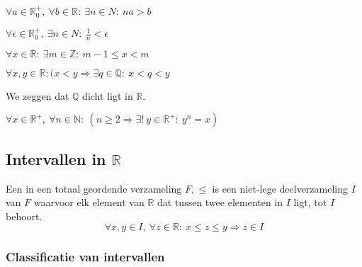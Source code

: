 \documentclass[main.tex]{subfiles}
\begin{document}
\begin{gev}
  $\forall a \in \mathbb{R}_{0}^{+},\ \forall b\in \mathbb{R}:\ \exists n\in N:\ na > b$
\end{gev}

\begin{gev}
  $\forall \epsilon \in \mathbb{R}_{0}^{+},\ \exists n\in N:\ \frac{1}{n} < \epsilon$
\end{gev}

\begin{gev}
  $\forall x\in \mathbb{R}:\ \exists m \in \mathbb{Z}:\ m-1 \le x < m$
\end{gev}

\begin{pr}
  $\forall x,y \in \mathbb{R}: (x<y \Rightarrow \exists q\in \mathbb{Q}:\ x<q<y$
\end{pr}

\begin{opm}
  We zeggen dat $\mathbb{Q}$ dicht ligt in $\mathbb{R}$.
\end{opm}


\begin{st}
  $\forall x\in \mathbb{R}^{+},\ \forall n\in \mathbb{N}:\ (n\ge 2 \Rightarrow \exists!\ y\in \mathbb{R}^{+}:\ y^{n}=x)$
\end{st}

\subsection{Intervallen in $\mathbb{R}$}
\label{sec:intervallen-in-R}

\begin{de}
  Een  in een totaal geordende verzameling $F,\le$ is een niet-lege deelverzameling $I$ van $F$ waarvoor elk element van $\mathbb{R}$ dat tussen twee elementen in $I$ ligt, tot $I$ behoort.
  \[ \forall x,y \in I,\ \forall z\in \mathbb{R}:\ x \le z \le y \Rightarrow z\in I \]
\end{de}

\subsubsection{Classificatie van intervallen}
\label{sec:class-van-interv}
\end{document}
